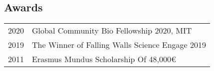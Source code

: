 \subsection{Awards}
\begin{longtable}
	{r|p{13cm}}
	\textsc{2020} & Global Community Bio Fellowship 2020, MIT\\
	\textsc{2019} & The Winner of Falling Walls Science Engage 2019\\
	\textsc{2011} & Erasmus Mundus Scholarship Of 48,000€\\
\end{longtable}
